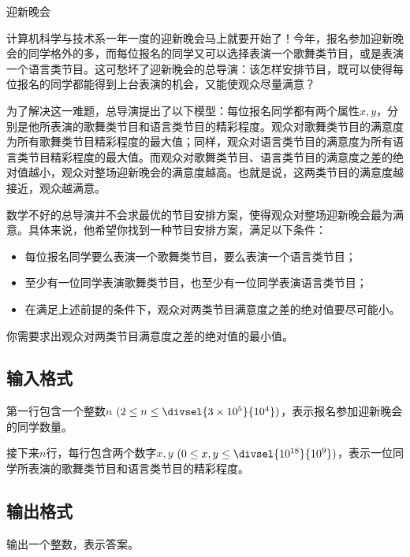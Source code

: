 \begin{Problem}{迎新晚会}{}

计算机科学与技术系一年一度的迎新晚会马上就要开始了！今年，报名参加迎新晚会的同学格外的多，而每位报名的同学又可以选择表演一个歌舞类节目，或是表演一个语言类节目。这可愁坏了迎新晚会的总导演：该怎样安排节目，既可以使得每位报名的同学都能得到上台表演的机会，又能使观众尽量满意？

为了解决这一难题，总导演提出了以下模型：每位报名同学都有两个属性$x, y$，分别是他所表演的歌舞类节目和语言类节目的精彩程度。观众对歌舞类节目的满意度为所有歌舞类节目精彩程度的最大值；同样，观众对语言类节目的满意度为所有语言类节目精彩程度的最大值。而观众对歌舞类节目、语言类节目的满意度之差的绝对值越小，观众对整场迎新晚会的满意度越高。也就是说，这两类节目的满意度越接近，观众越满意。

数学不好的总导演并不会求最优的节目安排方案，使得观众对整场迎新晚会最为满意。具体来说，他希望你找到一种节目安排方案，满足以下条件：

\begin{itemize}
\item 每位报名同学要么表演一个歌舞类节目，要么表演一个语言类节目；
\item 至少有一位同学表演歌舞类节目，也至少有一位同学表演语言类节目；
\item 在满足上述前提的条件下，观众对两类节目满意度之差的绝对值要尽可能小。
\end{itemize}

你需要求出观众对两类节目满意度之差的绝对值的最小值。

\subsection*{输入格式}

第一行包含一个整数$n$ $(2 \leq n \leq \divsel{3 \times 10^5}{10^4})$，表示报名参加迎新晚会的同学数量。

接下来$n$行，每行包含两个数字$x, y$ $(0 \leq x, y \leq \divsel{10^{18}}{10^9})$，表示一位同学所表演的歌舞类节目和语言类节目的精彩程度。

\subsection*{输出格式}

输出一个整数，表示答案。


\end{Problem}
